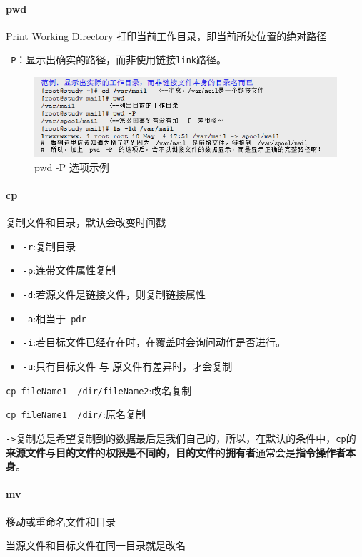 \documentclass[UTF8,a4paper,12pt]{ctexbook}
\begin{document}
		\paragraph{pwd} Print Working Directory 打印当前工作目录，即当前所处位置的绝对路径
		
			\verb|-P|：显示出确实的路径，而非使用链接\verb|link|路径。
			
			\begin{figure}[h]
				\centering
				\includegraphics[scale=0.7]{pwd.png}
				\caption{pwd -P 选项示例}
			\end{figure}
		\paragraph{cp} 复制文件和目录，默认会改变时间戳
			\begin{itemize}[itemindent = 1em]
				\item \verb|-r|:复制目录
				\item \verb|-p|:连带文件属性复制
				\item \verb|-d|:若源文件是链接文件，则复制链接属性
				\item \verb|-a|:相当于\verb|-pdr|
				\item \verb|-i|:若目标文件已经存在时，在覆盖时会询问动作是否进行。
				\item \verb|-u|:只有目标文件 与 原文件有差异时，才会复制
			\end{itemize}
			
			\verb|cp fileName1  /dir/fileName2|:改名复制
			
			\verb|cp fileName1  /dir/|:原名复制
			
			\verb|->|复制总是希望复制到的数据最后是我们自己的，所以，在默认的条件中，\verb|cp|的\textbf{来源文件}与\textbf{目的文件}的\textbf{权限是不同的}，\textbf{目的文件}的\textbf{拥有者}通常会是\textbf{指令操作者本身}。
			
		\paragraph{mv} 移动或重命名文件和目录
		
			当源文件和目标文件在同一目录就是改名
			
\end{document}
